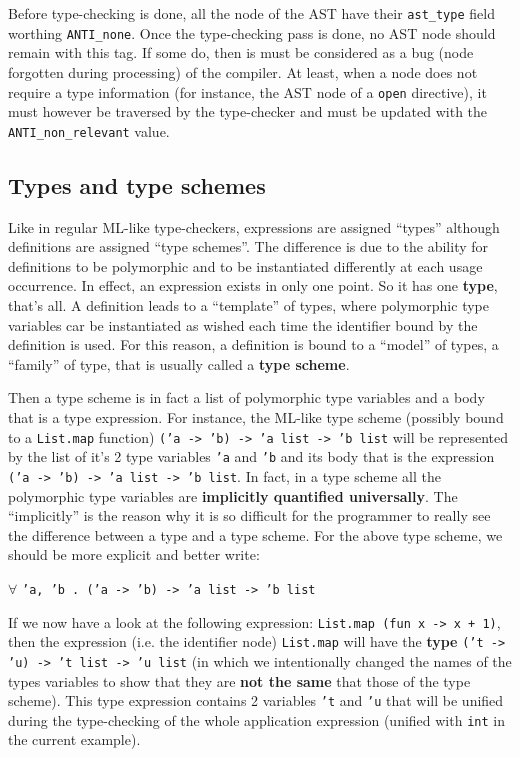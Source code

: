 Before type-checking is done, all the node of the AST have their
{\tt ast\_type} field worthing {\tt ANTI\_none}. Once the
type-checking pass is done, no AST node should remain with this
tag. If some do, then is must be considered as a bug (node forgotten
during processing) of the compiler. At least, when a node does not
require a type information (for instance, the AST node of a {\tt open}
directive), it must however be traversed by the type-checker and must
be updated with the {\tt ANTI\_non\_relevant} value.



\subsection{Types and type schemes}
\label{type-scheme}
Like in regular ML-like type-checkers, expressions are assigned
``types'' although definitions are assigned ``type schemes''. The
difference is due to the ability for definitions to be polymorphic and
to be instantiated differently at each usage occurrence. In effect, an
expression exists in only one point. So it has one {\bf type}, that's
all. A definition leads to a ``template'' of types, where polymorphic
type variables car be instantiated as wished each time the identifier
bound by the definition is used. For this reason, a definition is
bound to a ``model'' of types, a ``family'' of type, that is usually
called a {\bf type scheme}.

Then a type scheme is in fact a list of polymorphic type variables and
a body that is a type expression. For instance, the ML-like type scheme
(possibly bound to a {\tt List.map} function)
{\tt ('a -> 'b) -> 'a list -> 'b list} will be represented by the list
of it's 2 type variables {\tt 'a} and {\tt 'b} and its body that is
the expression {\tt ('a -> 'b) -> 'a list -> 'b list}. In fact, in a
type scheme all the polymorphic type variables are {\bf implicitly
quantified universally}. The ``implicitly'' is the reason why it is
so difficult for the programmer to really see the difference between a
type and a type scheme. For the above type scheme, we should be more
explicit and better write:

$\forall$ {\tt 'a, 'b . ('a -> 'b) -> 'a list -> 'b\ list}

If we now have a look at the following expression:
{\tt List.map (fun x -> x + 1)}, then the expression (i.e. the
identifier node) {\tt List.map} will have the {\bf type}
{\tt ('t -> 'u) -> 't list -> 'u list} (in which we intentionally
changed the names of the types variables to show that they are {\bf not
the same} that those of the type scheme). This type expression
contains 2 variables {\tt 't} and {\tt 'u} that will be unified during
the type-checking of the whole application expression (unified with
{\tt int} in the current example).

